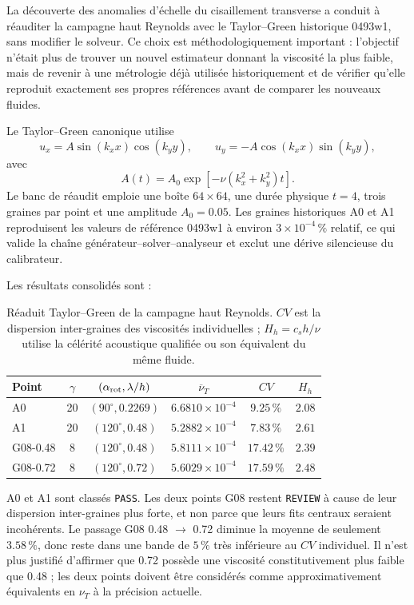 \documentclass[11pt,a4paper]{article}
\begin{document}
La découverte des anomalies d'échelle du cisaillement transverse a conduit à réauditer la campagne haut Reynolds avec le Taylor--Green historique 0493w1, sans modifier le solveur. Ce choix est méthodologiquement important : l'objectif n'était plus de trouver un nouvel estimateur donnant la viscosité la plus faible, mais de revenir à une métrologie déjà utilisée historiquement et de vérifier qu'elle reproduit exactement ses propres références avant de comparer les nouveaux fluides.

Le Taylor--Green canonique utilise
\begin{equation}
 u_x=A\sin(k_xx)\cos(k_yy),\qquad
 u_y=-A\cos(k_xx)\sin(k_yy),
\end{equation}
avec
\begin{equation}
 A(t)=A_0\exp[-\nu(k_x^2+k_y^2)t].
\end{equation}
Le banc de réaudit emploie une boîte $64\times64$, une durée physique $t=4$, trois graines par point et une amplitude $A_0=0.05$. Les graines historiques A0 et A1 reproduisent les valeurs de référence 0493w1 à environ $3\times10^{-4}\,\%$ relatif, ce qui valide la chaîne générateur--solver--analyseur et exclut une dérive silencieuse du calibrateur.

Les résultats consolidés sont :
\begin{table}[htbp]
\centering
\small
\caption{Réaduit Taylor--Green de la campagne haut Reynolds. $CV$ est la dispersion inter-graines des viscosités individuelles ; $H_h=c_sh/\nu$ utilise la célérité acoustique qualifiée ou son équivalent du même fluide.}
\label{tab:x13-highre-tg}
\begin{tabular}{lccccc}
\toprule
Point & $\gamma$ & $(\alpha_{\rm rot},\lambda/h)$ & $\overline\nu_T$ & $CV$ & $H_h$ \\
\midrule
A0 & 20 & $(90^\circ,0.2269)$ & $6.6810\times10^{-4}$ & $9.25\,\%$ & $2.08$ \\
A1 & 20 & $(120^\circ,0.48)$ & $5.2882\times10^{-4}$ & $7.83\,\%$ & $2.61$ \\
G08-0.48 & 8 & $(120^\circ,0.48)$ & $5.8111\times10^{-4}$ & $17.42\,\%$ & $2.39$ \\
G08-0.72 & 8 & $(120^\circ,0.72)$ & $5.6029\times10^{-4}$ & $17.59\,\%$ & $2.48$ \\
\bottomrule
\end{tabular}
\end{table}

A0 et A1 sont classés \texttt{PASS}. Les deux points G08 restent \texttt{REVIEW} à cause de leur dispersion inter-graines plus forte, et non parce que leurs fits centraux seraient incohérents. Le passage G08 0.48 $\rightarrow$ 0.72 diminue la moyenne de seulement $3.58\,\%$, donc reste dans une bande de $5\,\%$ très inférieure au $CV$ individuel. Il n'est plus justifié d'affirmer que 0.72 possède une viscosité constitutivement plus faible que 0.48 ; les deux points doivent être considérés comme approximativement équivalents en $\nu_T$ à la précision actuelle.
\end{document}
